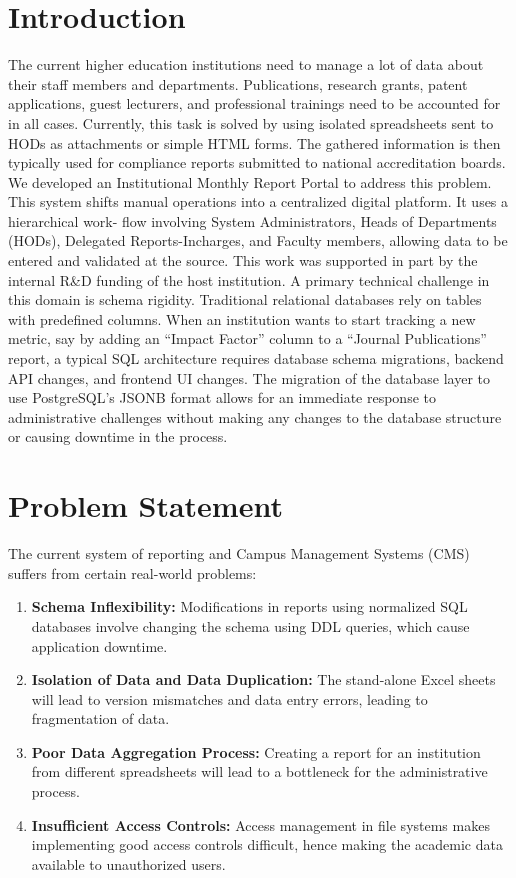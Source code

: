 \documentclass[conference]{IEEEtran}
\begin{document}
\section{Introduction}
The current higher education institutions need to manage a lot of data about their staff members and departments. Publications,  research  grants,  patent  applications,  guest  lecturers,  and professional trainings need to be accounted for in all cases.  Currently,  this  task  is  solved  by  using  isolated  spreadsheets  sent  to HODs as attachments or simple HTML forms. The gathered information  is  then  typically  used  for  compliance  reports submitted to national accreditation boards. We  developed  an Institutional  Monthly  Report  Portal to address this problem.  This  system  shifts  manual  operations  into a  centralized  digital  platform.  It  uses  a  hierarchical  work- flow involving System Administrators, Heads of Departments (HODs), Delegated Reports-Incharges, and Faculty members, allowing data to be entered and validated at the source. This work was supported in part by the internal R\&D funding of the host institution. A  primary  technical  challenge  in  this  domain  is  schema rigidity.  Traditional  relational  databases  rely  on  tables  with predefined  columns.  When an institution wants to start tracking a new metric, say by adding an “Impact Factor” column to a “Journal Publications” report, a typical SQL architecture requires database schema migrations, backend API changes, and frontend UI changes. The migration of the database layer to use PostgreSQL’s JSONB format allows for an immediate response to administrative challenges without making any changes to the database structure or causing downtime in the process.

\section{Problem Statement}
 The current system of reporting and Campus Management Systems (CMS) suffers from certain real-world problems:
\begin{enumerate}
    \item \textbf{Schema Inflexibility:} Modifications in reports using normalized SQL databases involve changing the schema using DDL queries, which cause application downtime.
    \item \textbf{Isolation of Data and Data Duplication:} The stand-alone Excel sheets will lead to version mismatches and data entry errors, leading to fragmentation of data.
    \item \textbf{Poor Data Aggregation Process:} Creating a report for an institution from different spreadsheets will lead to a bottleneck for the administrative process.
    \item \textbf{Insufficient Access Controls:} Access management in file systems makes implementing good access controls difficult, hence making the academic data available to unauthorized users.
\end{enumerate}
\end{document}
